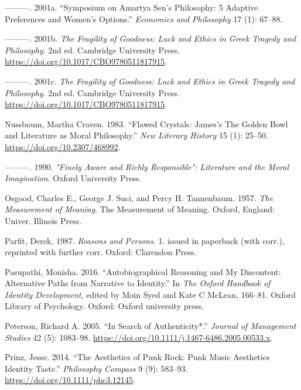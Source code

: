 \documentclass[12pt]{book}
\newenvironment{CSLReferences}%
  {\setlength{\parindent}{0pt}%
   \setlength{\leftskip}{0pt}%
   \setlength{\parskip}{0pt}}%
  {\par}
\theoremstyle{definition}
\theoremstyle{remark}
\begin{document}
\begin{CSLReferences}{1}{0}
---------. 2001a. {``Symposium on {Amartya Sen}'s Philosophy: 5 Adaptive Preferences and Women's Options.''} \emph{Economics and Philosophy} 17 (1): 67--88.

---------. 2001b. \emph{The {Fragility} of {Goodness}: {Luck} and {Ethics} in {Greek Tragedy} and {Philosophy}}. 2nd ed. Cambridge University Press. \url{https://doi.org/10.1017/CBO9780511817915}.

---------. 2001c. \emph{The {Fragility} of {Goodness}: {Luck} and {Ethics} in {Greek Tragedy} and {Philosophy}}. 2nd ed. Cambridge University Press. \url{https://doi.org/10.1017/CBO9780511817915}.

Nussbaum, Martha Craven. 1983. {``Flawed {Crystals}: {James}'s {The Golden Bowl} and {Literature} as {Moral Philosophy}.''} \emph{New Literary History} 15 (1): 25--50. \url{https://doi.org/10.2307/468992}.

---------. 1990. \emph{"{Finely Aware} and {Richly Responsible}": {Literature} and the {Moral Imagination}}. Oxford University Press.

Osgood, Charles E., George J. Suci, and Percy H. Tannenbaum. 1957. \emph{The Measurement of Meaning}. The Measurement of Meaning. Oxford, England: Univer. Illinois Press.

Parfit, Derek. 1987. \emph{Reasons and Persons}. 1. issued in paperback (with corr.), reprinted with further corr. Oxford: Clarendon Press.

Pasupathi, Monisha. 2016. {``Autobiographical {Reasoning} and {My} {Discontent}: {Alternative Paths} from {Narrative} to {Identity}.''} In \emph{The {Oxford} Handbook of Identity Development}, edited by Moin Syed and Kate C McLean, 166--81. Oxford Library of Psychology. Oxford: Oxford university press.

Peterson, Richard A. 2005. {``In {Search} of {Authenticity}*.''} \emph{Journal of Management Studies} 42 (5): 1083--98. \url{https://doi.org/10.1111/j.1467-6486.2005.00533.x}.

Prinz, Jesse. 2014. {``The {Aesthetics} of {Punk Rock}: {Punk Music Aesthetics Identity Taste}.''} \emph{Philosophy Compass} 9 (9): 583--93. \url{https://doi.org/10.1111/phc3.12145}.


\end{CSLReferences}
\end{document}
